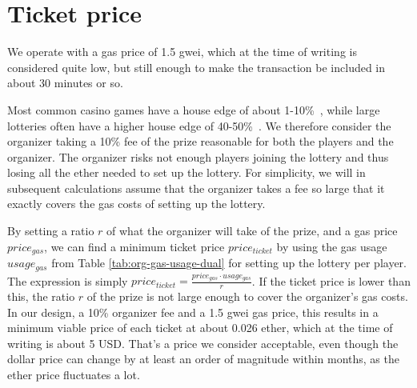 \section{Ticket price}
\label{sec:ticket-price}

We operate with a gas price of 1.5 gwei, which at the time of writing is considered quite low, but still enough to make the transaction be included in about 30 minutes or so. 

Most common casino games have a house edge of about 1-10\%~\cite{walsh_houses_nodate}, while large lotteries often have a higher house edge of 40-50\%~\cite{shackleford_house_nodate}. We therefore consider the organizer taking a 10\% fee of the prize reasonable for both the players and the organizer. The organizer risks not enough players joining the lottery and thus losing all the ether needed to set up the lottery. For simplicity, we will in subsequent calculations assume that the organizer takes a fee so large that it exactly covers the gas costs of setting up the lottery.

By setting a ratio $r$ of what the organizer will take of the prize, and a gas price $price_{gas}$, we can find a minimum ticket price $price_{ticket}$ by using the gas usage $usage_{gas}$ from Table \ref{tab:org-gas-usage-dual} for setting up the lottery per player. The expression is simply $price_{ticket}=\frac{price_{gas} \cdot usage_{gas}}{r}$. If the ticket price is lower than this, the ratio $r$ of the prize is not large enough to cover the organizer's gas costs. 
In our design, a 10\% organizer fee and a 1.5 gwei gas price, this results in a minimum viable price of each ticket at about 0.026 ether, which at the time of writing is about 5 USD. That's a price we consider acceptable, even though the dollar price can change by at least an order of magnitude within months, as the ether price fluctuates a lot.

